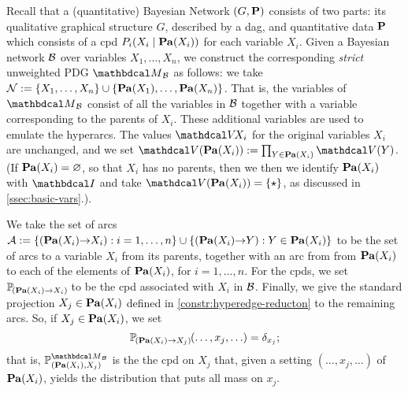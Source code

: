 \begin{subappendices}
\begin{defn}\label{def:bn2PDG}
Recall that a (quantitative) Bayesian Network $(G, \mathbf P)$ consists of two
parts: its qualitative graphical structure $G$, 
described by a dag,
and quantitative data $\mathbf P$ which consists of 
a cpd $P_i(X_i \mid \mathop{\mathbf{Pa}}\nolimits(X_i))$ for each variable $X_i$.
Given a Bayesian network $\cal B$ over variables
$X_1, \ldots, X_n$, we construct the corresponding \emph{strict} unweighted PDG
%
$\PDGof{{\mathcal B}}$
			as follows: we take $\mathcal N := \{X_1, \ldots, X_n \} \cup
			\{ \mathop{\mathbf{Pa}}\nolimits(X_1), \ldots, \mathop{\mathbf{Pa}}\nolimits(X_n)\}$.  
That is, the variables of 
	  $\PDGof{{\mathcal B}}$
consist of all the variables in
${\cal B}$ together with a variable corresponding to the parents
of $X_i$.
These additional variables are used to emulate the hyperarcs.  
The values $\V\!X_i$ for the original variables
			$X_i$ are unchanged, 
and we set $\V(\Pa(X_i)) := \prod_{Y \in \Pa(X_i)} \V(Y)$.
(If $\mathop{\mathbf{Pa}}\nolimits(X_i) = \varnothing$, so that $X_i$ has no parents, then we 
then we identify $\mathop{\mathbf{Pa}}\nolimits(X_i)$ with $\pdgunit$ and
take $\V(\Pa(X_i)) = \{\star\}$, as discussed in \cref{ssec:basic-vars}.).

We take the set of arcs $\mathcal A := \{ (\mathop{\mathbf{Pa}}\nolimits(X_i){\to} X_i) : 
i = 1, \ldots, n \} \cup \{ (\mathop{\mathbf{Pa}}\nolimits(X_i){\to}Y) : Y \in
			\mathop{\mathbf{Pa}}\nolimits(X_i)\}$ to be the set of arcs to a variable $X_i$
	  from its parents, together with an arc from
	  from $\mathop{\mathbf{Pa}}\nolimits(X_i)$ to each of the elements of $\mathop{\mathbf{Pa}}\nolimits(X_i)$, for
	  $i = 1, \ldots, n$.  
For the cpds, we set $\p_{(\Pa(X_i){\to}X_i)}$ to be the cpd associated
			with $X_i$ in $\cal B$.
Finally, we give the standard projection
    $X_j \in \mathop{\mathbf{Pa}}\nolimits(X_i)$ defined in \cref{constr:hyperedge-reducton}
    to the remaining arcs.
So, if $X_j \in \mathop{\mathbf{Pa}}\nolimits(X_i)$, we set
\[ \p_{(\Pa(X_i){\to}X_j)}(\ldots, x_j, \ldots) = \delta_{x_j};\]
that is,
$\mathbb P_{(\Pa(X_i), X_j)}^{\PDGof{\mathcal B}}$ is the the cpd 
on $X_j$ that, given a setting $(\ldots, x_j, \ldots)$ of $\mathop{\mathbf{Pa}}\nolimits(X_i)$, yields the distribution that puts all mass on $x_j$. 
\end{defn}

%


\end{subappendices}
